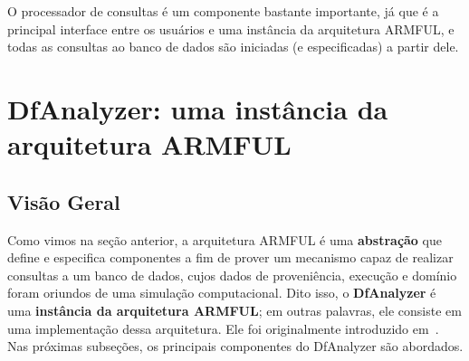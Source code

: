 O processador de consultas é um componente bastante importante, já que é a principal interface entre os usuários e uma instância da arquitetura ARMFUL, e todas as consultas ao banco de dados são iniciadas (e especificadas) a partir dele.

\section{DfAnalyzer: uma instância da arquitetura ARMFUL}

\subsection{Visão Geral}%
\label{subsec:dfanalyzer-visao-geral}

Como vimos na seção anterior, a arquitetura ARMFUL é uma \textbf{abstração} que define e especifica componentes a fim de prover um mecanismo capaz de realizar consultas a um banco de dados, cujos dados de proveniência, execução e domínio foram oriundos de uma simulação computacional. Dito isso, o \textbf{DfAnalyzer} é uma \textbf{instância da arquitetura ARMFUL}; em outras palavras, ele consiste em uma implementação dessa arquitetura. Ele foi originalmente introduzido em~\cite{silva2016situ}. Nas próximas subseções, os principais componentes do DfAnalyzer são abordados.



